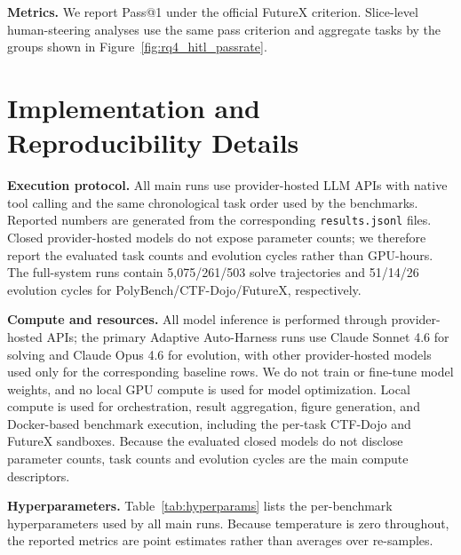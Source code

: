 \documentclass[11pt]{article}
\theoremstyle{plain}
\begin{document}
\noindent\textbf{Metrics.}
We report Pass@1 under the official FutureX criterion. Slice-level human-steering analyses use the same pass criterion and aggregate tasks by the groups shown in Figure~\ref{fig:rq4_hitl_passrate}.

\section{Implementation and Reproducibility Details}
\label{app:experimental-details}

\noindent\textbf{Execution protocol.}
All main runs use provider-hosted LLM APIs with native tool calling and the same chronological task order used by the benchmarks. Reported numbers are generated from the corresponding \texttt{results.jsonl} files. Closed provider-hosted models do not expose parameter counts; we therefore report the evaluated task counts and evolution cycles rather than GPU-hours. The full-system runs contain 5{,}075/261/503 solve trajectories and 51/14/26 evolution cycles for PolyBench/CTF-Dojo/FutureX, respectively.

\noindent\textbf{Compute and resources.}
All model inference is performed through provider-hosted APIs; the primary Adaptive Auto-Harness runs use Claude Sonnet 4.6 for solving and Claude Opus 4.6 for evolution, with other provider-hosted models used only for the corresponding baseline rows. We do not train or fine-tune model weights, and no local GPU compute is used for model optimization. Local compute is used for orchestration, result aggregation, figure generation, and Docker-based benchmark execution, including the per-task CTF-Dojo and FutureX sandboxes. Because the evaluated closed models do not disclose parameter counts, task counts and evolution cycles are the main compute descriptors.

\noindent\textbf{Hyperparameters.}
Table~\ref{tab:hyperparams} lists the per-benchmark hyperparameters used by all main runs. Because temperature is zero throughout, the reported metrics are point estimates rather than averages over re-samples.
\end{document}
